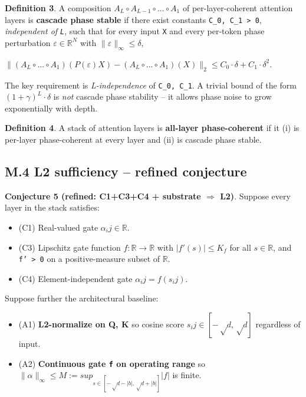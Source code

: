 \documentclass[11pt,a4paper]{article}
\theoremstyle{plain}
\theoremstyle{definition}
\begin{document}
\textbf{Definition 3}. A composition $A_L \circ  A_{L-1} \circ  ... \circ  A_1$ of per-layer-coherent attention layers is \textbf{cascade phase stable} if there exist constants \texttt{C\_0, C\_1 > 0}, \emph{independent of \texttt{L}}, such that for every input \texttt{X} and every per-token phase perturbation $\varepsilon  \in  \mathbb{R}^N$ with $\|\varepsilon \|_\infty  \le  \delta $,

$\|(A_L \circ  ... \circ  A_1)(P(\varepsilon )X) - (A_L \circ  ... \circ  A_1)(X)\|_2 \le  C_0 \cdot  \delta  + C_1 \cdot  \delta ^2$.

The key requirement is \emph{L-independence} of \texttt{C\_0, C\_1}. A trivial bound of the form $(1 + \gamma )^L \cdot  \delta $ is \emph{not} cascade phase stability -- it allows phase noise to grow exponentially with depth.

\textbf{Definition 4}. A stack of attention layers is \textbf{all-layer phase-coherent} if it (i) is per-layer phase-coherent at every layer and (ii) is cascade phase stable.

\subsection{M.4 L2 sufficiency -- refined conjecture}
\textbf{Conjecture 5 (refined: C1+C3+C4 + substrate $\Rightarrow$ L2)}. Suppose every layer in the stack satisfies:

\begin{itemize}
  \item (C1) Real-valued gate $\alpha _ij \in  \mathbb{R}$.
  \item (C3) Lipschitz gate function $f : \mathbb{R} \to  \mathbb{R}$ with $|f'(s)| \le  K_f$ for all $s \in  \mathbb{R}$, and \texttt{f' > 0} on a positive-measure subset of $\mathbb{R}$.
  \item (C4) Element-independent gate $\alpha _ij = f(s_ij)$.
\end{itemize}

Suppose further the architectural baseline:

\begin{itemize}
  \item (A1) \textbf{L2-normalize on Q, K} so cosine score $s_ij \in  [-√d, √d]$ regardless of input.
  \item (A2) \textbf{Continuous gate \texttt{f} on operating range} so $\|\alpha \|_\infty  \le  M := sup_{s \in  [-√d-|b|, √d+|b|]} |f|$ is finite.
\end{itemize}
\end{document}
